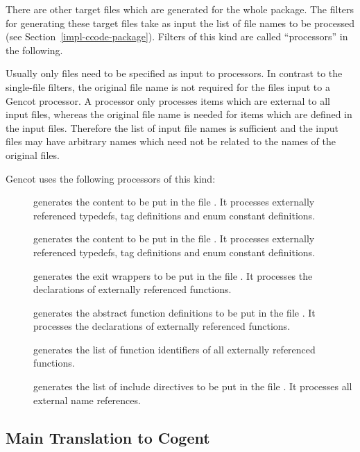 There are other target files which are generated for the whole package. The filters for generating these target files 
take as input the list of file names to be processed (see Section~\ref{impl-ccode-package}). Filters of this kind 
are called ``processors'' in the following. 

Usually only  files need to be specified as input to processors.
In contrast to the single-file filters, the original file name is not required for the files input to a 
Gencot processor. A processor only processes items which are external to all input files, whereas the original
file name is needed for items which are defined in the input files. Therefore the list of input file names is
sufficient and the input files may have arbitrary names which need not be related to the names of the original 
 files.

Gencot uses the following processors of this kind:
\begin{description}
\item[] generates the content to be put in the file . It 
processes externally referenced typedefs, tag definitions and enum constant definitions.
\item[] generates the content to be put in the file . It 
processes externally referenced typedefs, tag definitions and enum constant definitions.
\item[] generates the exit wrappers to be put in the file . It processes
the declarations of externally referenced functions.
\item[] generates the abstract function definitions to be put in the file 
. It processes the declarations of externally referenced functions.
\item[] generates the list of function identifiers of all externally referenced functions.
\item[] generates the list of include directives to be put in the file
. It processes all external name references. 
\end{description}

\subsection{Main Translation to Cogent}
\label{impl-ccomps-main}

